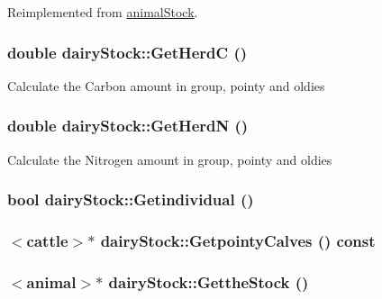 Reimplemented from \hyperlink{classanimal_stock_a8bed676752d1e6414c9a73fe72e3cb85}{animalStock}.\hypertarget{classdairy_stock_aef1627aca995e99f7abecf477ef02be9}{
\subsubsection[{GetHerdC}]{\setlength{\rightskip}{0pt plus 5cm}double dairyStock::GetHerdC ()}}
\label{classdairy_stock_aef1627aca995e99f7abecf477ef02be9}
Calculate the Carbon amount in group, pointy and oldies \hypertarget{classdairy_stock_a1e7445e8dc3f08acecfd0d22c8e097f3}{
\subsubsection[{GetHerdN}]{\setlength{\rightskip}{0pt plus 5cm}double dairyStock::GetHerdN ()}}
\label{classdairy_stock_a1e7445e8dc3f08acecfd0d22c8e097f3}
Calculate the Nitrogen amount in group, pointy and oldies \hypertarget{classdairy_stock_a61d3ed76c3e663bf7da37257bc6a3ff3}{
\subsubsection[{Getindividual}]{\setlength{\rightskip}{0pt plus 5cm}bool dairyStock::Getindividual ()}}
\label{classdairy_stock_a61d3ed76c3e663bf7da37257bc6a3ff3}
\hypertarget{classdairy_stock_a58e319d3fd9eb8d586d9e2b85279f379}{
\subsubsection[{GetpointyCalves}]{$<${\bf cattle}$>$$\ast$ dairyStock::GetpointyCalves () const}}
\label{classdairy_stock_a58e319d3fd9eb8d586d9e2b85279f379}
\hypertarget{classdairy_stock_af2ccb2b39af72516a6b917c13db1e7cd}{
\subsubsection[{GettheStock}]{$<${\bf animal}$>$$\ast$ dairyStock::GettheStock ()}}
